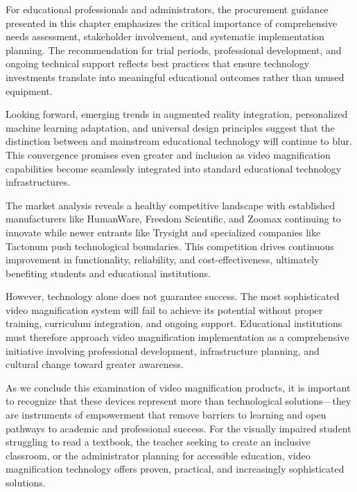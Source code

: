 For educational professionals and administrators, the procurement guidance presented in this chapter emphasizes the critical importance of comprehensive needs assessment, stakeholder involvement, and systematic implementation planning. The recommendation for trial periods, professional development, and ongoing technical support reflects best practices that ensure technology investments translate into meaningful educational outcomes rather than unused equipment.

Looking forward, emerging trends in augmented reality integration, personalized machine learning adaptation, and universal design principles suggest that the distinction between  and mainstream educational technology will continue to blur. This convergence promises even greater  and inclusion as video magnification capabilities become seamlessly integrated into standard educational technology infrastructures.

The market analysis reveals a healthy competitive landscape with established manufacturers like HumanWare, Freedom Scientific, and Zoomax continuing to innovate while newer entrants like Trysight and specialized companies like Tactonum push technological boundaries. This competition drives continuous improvement in functionality, reliability, and cost-effectiveness, ultimately benefiting students and educational institutions.

However, technology alone does not guarantee success. The most sophisticated video magnification system will fail to achieve its potential without proper training, curriculum integration, and ongoing support. Educational institutions must therefore approach video magnification implementation as a comprehensive initiative involving professional development, infrastructure planning, and cultural change toward greater  awareness.

As we conclude this examination of video magnification products, it is important to recognize that these devices represent more than technological solutions—they are instruments of empowerment that remove barriers to learning and open pathways to academic and professional success. For the visually impaired student struggling to read a textbook, the teacher seeking to create an inclusive classroom, or the administrator planning for accessible education, video magnification technology offers proven, practical, and increasingly sophisticated solutions.

